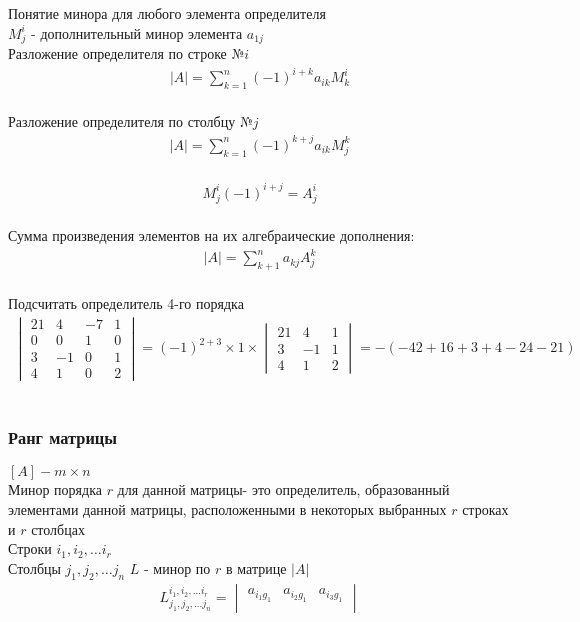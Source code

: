 \documentclass[a4paper, 11pt, oneside]{article}
\begin{document}
\newpage
Понятие минора для любого элемента определителя\\
$M_j^i$ - дополнительный минор элемента $a_{1j}$\\
Разложение определителя по строке $№i$
\begin{gather*}
	|A| = 
	\sum_{k=1}^n (-1)^{i+k} a_{ik}M^i_k 
\end{gather*}\\
Разложение определителя по столбцу $№j$
\begin{gather*}
	|A| = 
	\sum_{k=1}^n (-1)^{k+j} a_{ik}M^k_j 
\end{gather*}\\
\begin{gather*}
	M_j^i(-1)^{i+j} = A_j^i
\end{gather*}\\
Сумма произведения элементов на их алгебраические дополнения:
\begin{gather*}
	|A|=\sum^n_{k+1}a_{kj}A_j^k
\end{gather*}\\
Подсчитать определитель 4-го порядка
\begin{gather*}
	\begin{vmatrix}
		21& 4& -7& 1\\
		0& 0& 1& 0\\
		3& -1& 0& 1\\
		4& 1& 0& 2
	\end{vmatrix}
	=
	(-1)^{2+3}\times1\times
	\begin{vmatrix}
		21& 4& 1\\
		3& -1& 1\\
		4& 1& 2
	\end{vmatrix}
	=
	-(-42+16+3+4-24-21)
\end{gather*}\\

\subsubsection{Ранг матрицы}
$[A] - m\times n$\\
Минор порядка $r$ для данной матрицы- это определитель, образованный  элементами данной матрицы, расположенными в некоторых выбранных $r$ строках и $r$ столбцах\\
Строки $i_1, i_2, \dots i_r$\\
Столбцы $j_1, j_2, \dots j_n$
$L$ - минор по $r$ в матрице $|A|$\\
\begin{gather*}
	L^{i_1, i_2, \dots i_r}_{j_1, j_2, \dots j_n}=
	\begin{vmatrix}
		a_{i_1g_1}& a_{i_2g_1}& a_{i_3g_1}\\
	\end{vmatrix}
\end{gather*}
\end{document}
